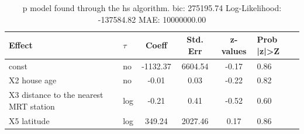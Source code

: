 \begin{table}
	\caption{p model found through the hs algorithm. bic: 275195.74 Log-Likelihood: -137584.82 MAE: 10000000.00}
	\begin{center}
		\begin{tabular}{|l|l|c|c|c|l|}
			\hline
			Effect & $\tau$ & Coeff & Std. Err & z-values & Prob |z|>Z \\
			\hline
			const & no & -1132.37 & 6604.54 & -0.17 & 0.86 \\
			\hline
			X2 house age & no & -0.01 & 0.03 & -0.22 & 0.82 \\
			\hline
			X3 distance to the nearest MRT station & log & -0.21 & 0.41 & -0.52 & 0.60 \\
			\hline
			X5 latitude & log & 349.24 & 2027.46 & 0.17 & 0.86 \\
			\hline
		\end{tabular}
	\end{center}
\end{table}